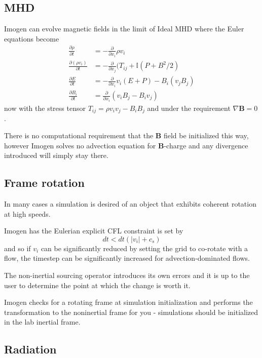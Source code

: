 \documentclass[letterpaper,12pt,twocolumn]{article}
\begin{document}
\subsection{MHD}

Imogen can evolve magnetic fields in the limit of Ideal MHD where the Euler equations
become
\begin{align*}
\frac{\partial \rho}{\partial t} &= -\frac{\partial}{\partial x_i} \rho v_i \\
\frac{\partial (\rho v_i)}{\partial t} &= -\frac{\partial}{\partial x_j} (T_{ij} + \mathbb{I}(P+B^2/2) \\
\frac{\partial E}{\partial t} &= -\frac{\partial}{\partial x_i} v_i (E + P) - B_i (v_j B_j) \\
\frac{\partial B_i}{\partial t} &= \frac{\partial}{\partial x_i} (v_i B_j - B_i v_j)
\end{align*}
now with the stress tensor $T_{ij} = \rho v_i v_j - B_i B_j$ and under the requirement
$\nabla \mathbf{B} = 0$.

There is no computational requirement that the \textbf{B} field be initialized this way,
however Imogen solves no advection equation for $\mathbf{B}$-charge and any divergence
introduced will simply stay there.

\subsection{Frame rotation}

In many cases a simulation is desired of an object that exhibits coherent rotation at
high speeds.

Imogen has the Eulerian explicit CFL constraint is set by
\[ dt < dt (|v_i| + c_s) \]
and so if $v_i$ can be significantly reduced by setting the grid to co-rotate with a flow,
the timestep can be significantly increased for advection-dominated flows.

The non-inertial sourcing operator introduces its own errors and it is up to the user to
determine the point at which the change is worth it.

Imogen checks for a rotating frame at simulation initialization and performs the
transformation to the noninertial frame for you - simulations should be initialized
in the lab inertial frame.

\subsection{Radiation}
\end{document}
